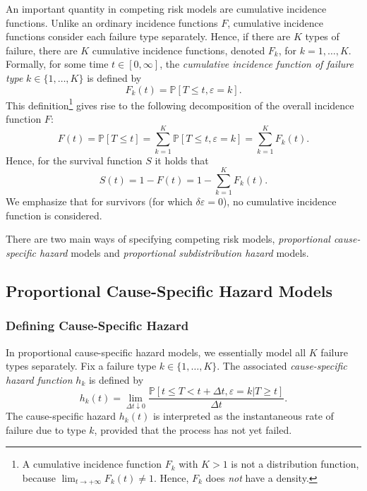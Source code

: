 \documentclass[11pt]{article}
\renewcommand{\P}{\mathbb{P}}
\begin{document}
An important quantity in competing risk models are cumulative incidence functions. Unlike an ordinary incidence functions $F$, cumulative incidence functions consider each failure type separately. Hence, if there are $K$ types of failure, there are $K$ cumulative incidence functions, denoted $F_k$, for $k=1,\dots,K$. Formally, for some time $t\in[0,\infty]$, the \textit{cumulative incidence function of failure type} $k\in\{1,\dots,K\}$ is defined by
\[
    F_k(t) = \P[T \leq t , \varepsilon = k].
\]
This definition\footnote{A cumulative incidence function $F_k$ with $K>1$ is not a distribution function, because $\lim_{t\to+\infty}F_k(t) \neq 1$. Hence, $F_k$ does \textit{not} have a density.} gives rise to the following decomposition of the overall incidence function $F$:
\[
    F(t) = \P[T \leq t] = \sum_{k=1}^K \P[T \leq t, \varepsilon = k] = \sum_{k=1}^K F_k(t).
\]
Hence, for the survival function $S$ it holds that
\[
    S(t) = 1 - F(t) = 1 -  \sum_{k=1}^K F_k(t).
\]
We emphasize that for survivors (for which $\delta\varepsilon=0$), no cumulative incidence function is considered.

There are two main ways of specifying competing risk models, \textit{proportional cause-specific hazard} models and \textit{proportional subdistribution hazard} models.


\subsection{Proportional Cause-Specific Hazard Models}
\subsubsection{Defining Cause-Specific Hazard}
In proportional cause-specific hazard models, we essentially model all $K$ failure types separately. Fix a failure type $k \in \{1,\dots,K\}.$ The associated \textit{cause-specific hazard function} $h_k$ is defined by
\begin{equation} \label{eq:hazard-cs}
	h_k(t) = \lim_{\Delta t \downarrow 0} \frac{\P[ t\leq T < t + \Delta t, \varepsilon = k | T \geq t]}{\Delta t}.
\end{equation}
The cause-specific hazard $h_k(t)$ is interpreted as the instantaneous rate of failure due to type $k$, provided that the process has not yet failed.
\end{document}
